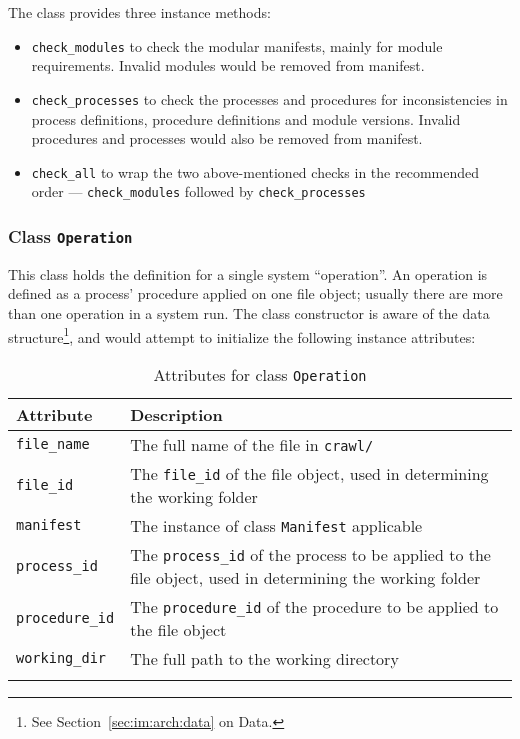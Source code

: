 The class provides three instance methods:

\begin{itemize}
    \item \texttt{check\_modules} to check the modular manifests, mainly
    for module requirements. Invalid modules would be removed from manifest.
    \item \texttt{check\_processes} to check the processes and procedures
    for inconsistencies in process definitions, procedure definitions and
    module versions. Invalid procedures and processes would also be removed
    from manifest.
    \item \texttt{check\_all} to wrap the two above-mentioned checks in
    the recommended order --- \texttt{check\_modules} followed by
    \texttt{check\_processes}
\end{itemize}

\subsubsection{Class \texttt{Operation}}

This class holds the definition for a single system ``operation''. An
operation is defined as a process' procedure applied on one file object;
usually there are more than one operation in a system run. The class
constructor is aware of the data structure\footnote{See
Section~\ref{sec:im:arch:data} on Data.}, and would attempt to initialize
the following instance attributes:

\begin{longtabu}{X[1,l]X[3,l]}
    \textbf{Attribute} & \textbf{Description} \\
    \midrule
    \endhead{}
    \texttt{file\_name} &
    The full name of the file in \texttt{crawl/} \\
    \texttt{file\_id} &
    The \texttt{file\_id} of the file object, used in determining
    the working folder \\
    \texttt{manifest} &
    The instance of class \texttt{Manifest} applicable \\
    \texttt{process\_id} &
    The \texttt{process\_id} of the process to be applied to the
    file object, used in determining the working folder \\
    \texttt{procedure\_id} &
    The \texttt{procedure\_id} of the procedure to be applied to the
    file object \\
    \texttt{working\_dir} & 
    The full path to the working directory \\
    \caption{Attributes for class \texttt{Operation}}
\end{longtabu}

